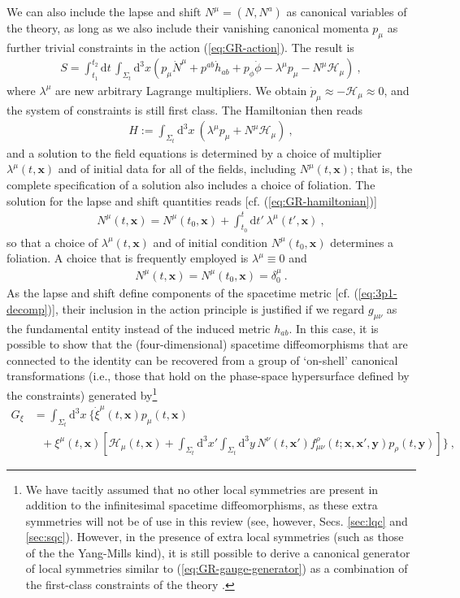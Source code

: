 \documentclass[12pt]{iopart}
\def\eq#1{\begin{equation}\begin{aligned}#1\end{aligned}\end{equation}}
\def\eref#1{(\ref{eq:#1})}
\def\D{\mathrm{d}}
\def\x{\mathbf{x}}
\def\y{\mathbf{y}}
\begin{document}
We can also include the lapse and shift $N^{\mu} = (N,N^a)$ as canonical variables of the theory, as long as we also include their vanishing canonical momenta $p_{\mu}$ as further trivial constraints in the action \eref{GR-action}. The result is
\eq{\label{eq:GR-action-2}
S = \int_{t_1}^{t_2}\D t\,\int_{\Sigma_t}\D^3 x  \left(p_{\mu}\dot{N}^{\mu}+p^{ab}\dot{h}_{ab}+p_{\phi}\dot{\phi}-\lambda^{\mu}p_{\mu}-N^{\mu}\mathcal{H}_{\mu}\right) \ ,
}
where $\lambda^{\mu}$ are new arbitrary Lagrange multipliers. We obtain $\dot{p}_{\mu} \approx -\mathcal{H}_{\mu} \approx 0$, and the system of constraints is still first class. The Hamiltonian then reads
\eq{\label{eq:GR-hamiltonian}
H := \int_{\Sigma_t}\D^3x\ \left(\lambda^{\mu}p_{\mu}+N^{\mu}\mathcal{H}_{\mu}\right) \ ,
}
and a solution to the field equations is determined by a choice of multiplier $\lambda^{\mu}(t,\x)$ and of initial data for all of the fields, including $N^{\mu}(t,\x)$; that is, the complete specification of a solution also includes a choice of foliation. The solution for the lapse and shift quantities reads [cf. \eref{GR-hamiltonian}]
\eq{\label{eq:lapse-shift-sol}
N^{\mu}(t,\x) = N^{\mu}(t_0,\x)+\int_{t_0}^t\D t'\ \lambda^{\mu}(t',\x) \ ,
}
so that a choice of $\lambda^{\mu}(t,\x)$ and of initial condition $N^{\mu}(t_0,\x)$ determines a foliation. A choice that is frequently employed is $\lambda^{\mu}\equiv0$ and
\eq{\label{eq:proper-time-fol}
N^{\mu}(t,\x) = N^{\mu}(t_0,\x) = \delta^{\mu}_0 \ .
}
As the lapse and shift define components of the spacetime metric [cf. \eref{3p1-decomp}], their inclusion in the action principle is justified if we regard $g_{\mu\nu}$ as the fundamental entity instead of the induced metric $h_{ab}$. In this case, it is possible to show that the (four-dimensional) spacetime diffeomorphisms that are connected to the identity can be recovered from a group of `on-shell' canonical transformations (i.e., those that hold on the phase-space hypersurface defined by the constraints) generated by\footnote{We have tacitly assumed that no other local symmetries are present in addition to the infinitesimal spacetime diffeomorphisms, as these extra symmetries will not be of use in this review (see, however, Secs. \ref{sec:lqc} and \ref{sec:sqc}). However, in the presence of extra local symmetries (such as those of the the Yang-Mills kind), it is still possible to derive a canonical generator of local symmetries similar to \eref{GR-gauge-generator} as a combination of the first-class constraints of the theory \citep{Pons:1996av,Pons:1999xu,Pons:2010ad}.}
\eq{\label{eq:GR-gauge-generator}
G_{\xi} &= \int_{\Sigma_t}\D^3x\ \biggl\{\dot{\xi}^{\mu}(t,\x)p_{\mu}(t,\x)\\
&\ \ \ +\xi^{\mu}(t,\x)\left[\mathcal{H}_{\mu}(t,\x)+\int_{\Sigma_t}\D^3x'\int_{\Sigma_t}\D^3y\,N^{\nu}(t,\x')f_{\mu\nu}^{\rho}(t;\x,\x',\y)p_{\rho}(t,\y)\right]\biggl\} \ ,
}
\end{document}
